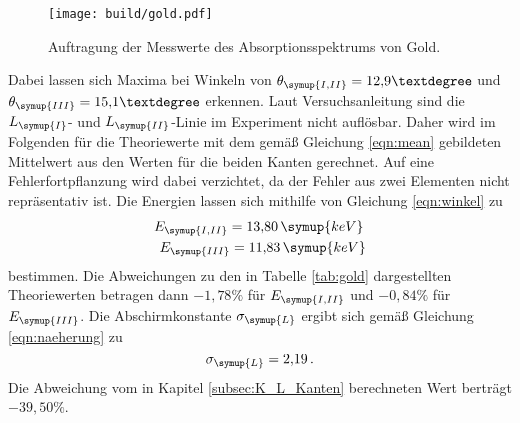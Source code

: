 \begin{figure}
  \centering
  \texttt{[image: build/gold.pdf]}
  \caption{Auftragung der Messwerte des Absorptionsspektrums von Gold.}
  \label{fig:gold}
\end{figure}

Dabei lassen sich Maxima bei Winkeln von $\theta_{\symup{I,II}}=12{,}9°$ und
$\theta_{\symup{III}}=15{,}1°$ erkennen. Laut Versuchsanleitung \cite{Versuchsanleitung}
sind die $L_{\symup{I}}$- und $L_{\symup{II}}$-Linie im Experiment nicht auflösbar.
Daher wird im Folgenden für die Theoriewerte mit dem gemäß Gleichung \eqref{eqn:mean}
gebildeten Mittelwert aus den Werten für die beiden Kanten gerechnet. Auf eine
Fehlerfortpflanzung wird dabei verzichtet, da der Fehler aus zwei Elementen nicht
repräsentativ ist. Die Energien lassen sich mithilfe von Gleichung \eqref{eqn:winkel}
zu
\begin{align*}
  E_{\symup{I,II}}=13{,}80\,\symup{keV} \, \\
  E_{\symup{III}}=11{,}83\,\symup{keV}
\end{align*}
bestimmen.
Die Abweichungen zu den in Tabelle \ref{tab:gold} dargestellten Theoriewerten
betragen dann $-1{,}78\%$ für $E_{\symup{I,II}}$ und $-0{,}84\%$ für $E_{\symup{III}}$.
Die Abschirmkonstante $\sigma_{\symup{L}}$ ergibt sich gemäß Gleichung
\eqref{eqn:naeherung} zu
\begin{equation*}
  \sigma_{\symup{L}}=2{,}19 \,.
\end{equation*}
Die Abweichung vom in Kapitel \ref{subsec:K_L_Kanten} berechneten Wert berträgt
$-39{,}50\%$.
